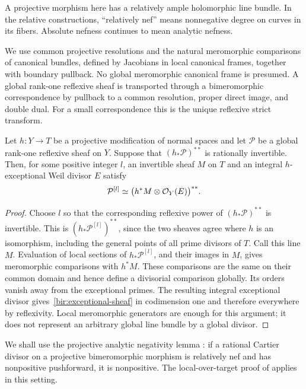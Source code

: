 A projective morphism here has a relatively ample holomorphic line
bundle.  In the relative constructions, ``relatively nef'' means
nonnegative degree on curves in its fibers.  Absolute nefness continues
to mean analytic nefness.

We use common projective resolutions and the natural meromorphic
comparisons of canonical bundles, defined by Jacobians in local
canonical frames, together with boundary pullback.  No global
meromorphic canonical frame is presumed.  A global rank-one reflexive
sheaf is transported through a bimeromorphic correspondence by
pullback to a common resolution, proper direct image, and double dual.
For a small correspondence this is the unique reflexive strict
transform.

\begin{lemma}
\label{bir:sheaf-comparison}
Let $h:Y\to T$ be a projective modification of normal spaces and let
$\mathcal P$ be a global rank-one reflexive sheaf on $Y$.  Suppose that
$(h_*\mathcal P)^{**}$ is rationally invertible.  Then, for some positive
integer $l$, an invertible sheaf $M$ on $T$ and an integral
$h$-exceptional Weil divisor $E$ satisfy
\begin{equation}
 \mathcal P^{[l]}\simeq
 \bigl(h^*M\otimes\mathcal{O}_Y(E)\bigr)^{**}.
 \label{bir:exceptional-sheaf}
\end{equation}
\end{lemma}

\begin{proof}
Choose $l$ so that the corresponding reflexive power of
$(h_*\mathcal P)^{**}$ is invertible.  This is
$(h_*\mathcal P^{[l]})^{**}$, since the two sheaves agree where $h$ is an
isomorphism, including the general points of all prime divisors of
$T$.  Call this line $M$.  Evaluation of local sections of
$h_*\mathcal P^{[l]}$, and their images in $M$, gives meromorphic
comparisons with $h^*M$.  These comparisons are the same on their common
domain and hence define a divisorial comparison globally.  Its orders
vanish away from the exceptional primes.  The resulting integral
exceptional divisor gives~\eqref{bir:exceptional-sheaf} in codimension
one and therefore everywhere by reflexivity.  Local meromorphic
generators are enough for this argument; it does not represent an
arbitrary global line bundle by a global divisor.
\end{proof}

We shall use the projective analytic negativity lemma
\cite{FujinoAnalyticMMP,BirationalGeometry}: if a rational Cartier
divisor on a projective bimeromorphic morphism is relatively nef and
has nonpositive pushforward, it is nonpositive.  The local-over-target
proof of \cite[Lemma~3.39]{BirationalGeometry} applies in this setting.

